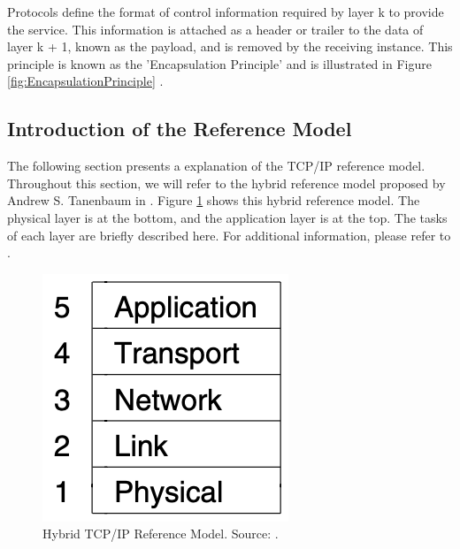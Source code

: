 Protocols define the format of control information required by layer k to provide the service. This information is attached as a header or trailer to the data of layer k + 1, known as the payload, and is removed by the receiving instance. This principle is known as the 'Encapsulation Principle' and is illustrated in Figure \ref{fig:EncapsulationPrinciple} \cite{Tanenbaum2010}.



\subsection{Introduction of the Reference Model}

The following section presents a explanation of the TCP/IP reference model. Throughout this section, we will refer to the hybrid reference model proposed by Andrew S. Tanenbaum in \cite{Tanenbaum2010}. Figure \ref{fig:RefModel} shows this hybrid reference model. The physical layer is at the bottom, and the application layer is at the top. The tasks of each layer are briefly described here. For additional information, please refer to \cite{Tanenbaum2010}.

\begin{figure}[h]
    \centering
    \includegraphics[width=0.25\linewidth]{figures/tcpip_refmodel/image3.png}
    \caption[Hybrid TCP/IP Reference Model]{Hybrid TCP/IP Reference Model. Source: \cite{Tanenbaum2010}.}
    \label{fig:RefModel}
\end{figure}
	
